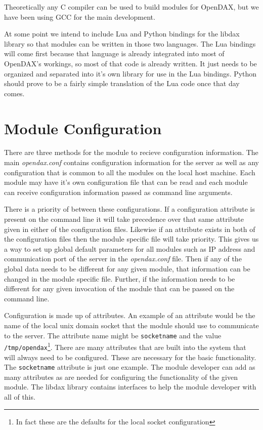 \documentclass[10pt,letterpaper]{report}
\begin{document}
Theoretically any C compiler can be used to build modules for OpenDAX, but we have been using GCC for the main development.

At some point we intend to include Lua and Python bindings for the libdax library so that modules can be written in those two languages.  The Lua bindings will come first because that language is already integrated into most of OpenDAX's workings, so most of that code is already written.  It just needs to be organized and separated into it's own library for use in the Lua bindings.  Python should prove to be a fairly simple translation of the Lua code once that day comes.

\chapter{Module Configuration}

There are three methods for the module to recieve configuration information.  The main \textit{opendax.conf} contains configuration information for the server as well as any configuration that is common to all the modules on the local host machine.  Each module may have it's own configuration file that can be read and each module can receive configuration information passed as command line arguments.

There is a priority of between these configurations.  If a configuration attribute is present on the command line it will take precedence over that same attribute given in either of the configuration files.  Likewise if an attribute exists in both of the configuration files then the module specific file will take priority.  This gives us a way to set up global default parameters for all modules such as IP address and communication port of the server in the \textit{opendax.conf} file.  Then if any of the global data needs to be different for any given module, that information can be changed in the module specific file.  Further, if the information needs to be different for any given invocation of the module that can be passed on the command line.

Configuration is made up of attributes.  An example of an attribute would be the name of the local unix domain socket that the module should use to communicate to the server.  The attribute name might be \texttt{socketname} and the value \texttt{/tmp/opendax}\footnote{In fact these are the defaults for the local socket configuration}.  There are many attributes that are built into the system that will always need to be configured.  These are necessary for the basic functionality.  The \texttt{socketname} attribute is just one example.  The module developer can add as many attributes as are needed for configuring the functionality of the given module.  The libdax library contains interfaces to help the module developer with all of this.
\end{document}

